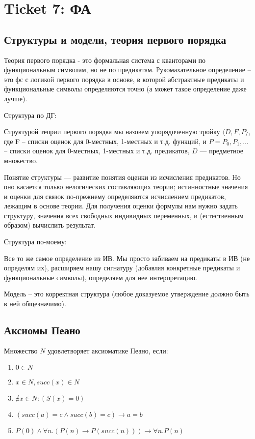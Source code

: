 \section{Ticket 7: ФА}
\label{sec-9}
\subsection{Структуры и модели, теория первого порядка}
\label{sec-9-1}
Теория первого порядка - это формальная система с кванторами по
функциональным символам, но не по предикатам. Рукомахательное
определение – это фс с логикой первого порядка в основе, в которой
абстрактные предикаты и функциональные символы определяются точно
(а может такое определение даже лучше).

Структура по ДГ:

Структурой теории первого порядка мы назовем упорядоченную тройку
$\langle D, F, P\rangle$, где F -- списки оценок для 0-местных, 1-местных и т.д.
функций, и $P = P_0, P_1,\dotsc$ -- списки оценок для 0-местных,
1-местных и т.д. предикатов, $D$ — предметное множество.

Понятие структуры — развитие понятия оценки из исчисления предикатов.
Но оно касается только нелогических составляющих теории; истинностные
значения и оценки для связок по-прежнему определяются исчислением
предикатов, лежащим в основе теории. Для получения оценки формулы
нам нужно задать структуру, значения всех свободных индивидных
переменных, и (естественным образом) вычислить результат.

Структура по-моему:

Все то же самое определение из ИВ. Мы просто забиваем на предикаты
в ИВ (не определям их), расширяем нашу сигнатуру (добавляя конкретные
предикаты и функциональные символы), определяем для нее интерпретацию.

Модель -- это корректная структура (любое доказуемое утверждение должно
быть в ней общезначимо).
\subsection{Аксиомы Пеано}
\label{sec-9-2}
Множество $N$ удовлетворяет аксиоматике Пеано, если:
\begin{enumerate}
\item $0 \in N$
\item $x \in N, succ(x) \in N$
\item $\nexists x \in N : (S(x) = 0)$
\item $(succ(a) = c \land succ(b) = c) \to a = b$
\item $P(0) \land \forall n.(P(n) \to P(succ(n))) \to \forall n.P(n)$
\end{enumerate}

